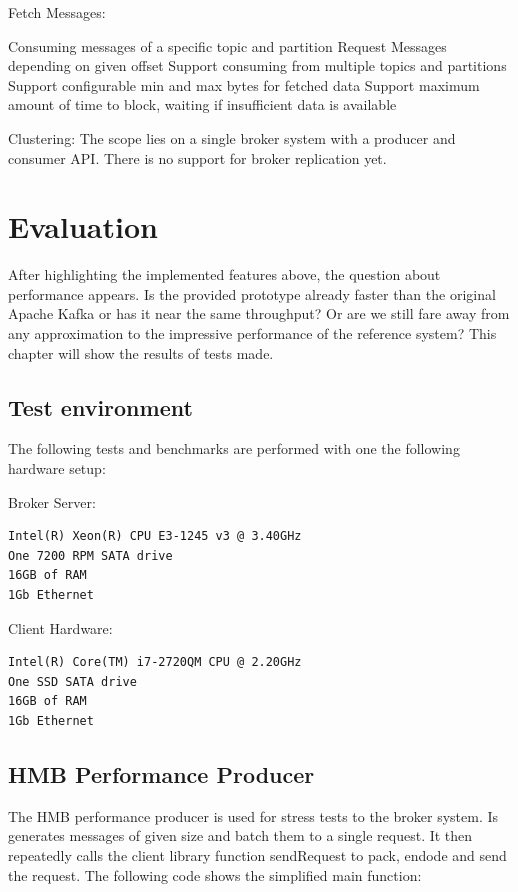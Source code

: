 Fetch Messages: 
\begin{itemize}
        \tick Consuming messages of a specific topic and partition
        \tick Request Messages depending on given offset
        \fail Support consuming from multiple topics and partitions 
        \fail Support configurable min and max bytes for fetched data
        \fail Support maximum amount of time to block, waiting if insufficient
        data is available
\end{itemize}
Clustering: The scope lies on a single broker system with a producer and
consumer API. There is no support for broker replication yet. 

\section{Evaluation}
After highlighting the implemented features above, the question about
performance appears. Is the provided prototype already faster than the original
Apache Kafka or has it near the same throughput? Or are we still fare away from any
approximation to the impressive performance of the reference system? This
chapter will show the results of tests made.

\subsection{Test environment}
The following tests and benchmarks are performed with one the following
hardware setup:

Broker Server:
\begin{verbatim}
Intel(R) Xeon(R) CPU E3-1245 v3 @ 3.40GHz
One 7200 RPM SATA drive
16GB of RAM
1Gb Ethernet 
\end{verbatim}

Client Hardware:
\begin{verbatim}
Intel(R) Core(TM) i7-2720QM CPU @ 2.20GHz
One SSD SATA drive
16GB of RAM 
1Gb Ethernet
\end{verbatim}

\subsection{HMB Performance Producer}
\label{conc-eval-hmbperformanceprod}
The HMB performance producer is used for stress tests to the broker system. Is
generates messages of given size and batch them to a single request. It then
repeatedly calls the client library function sendRequest to pack, endode and
send the request. The following code shows the simplified main function: 


